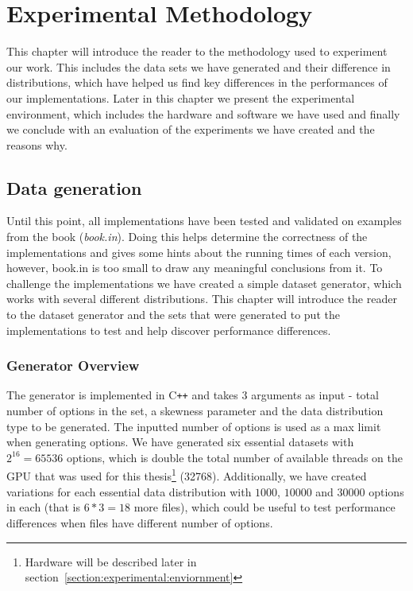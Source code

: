 \chapter{Experimental Methodology}
This chapter will introduce the reader to the methodology used to experiment our work. This includes the data sets we have generated and their difference in distributions, which have helped us find key differences in the performances of our implementations. Later in this chapter we present the experimental environment, which includes the hardware and software we have used and finally we conclude with an evaluation of the experiments we have created and the reasons why.

\label{chapter:experimentalmethodology}
\section{Data generation}
Until this point, all implementations have been tested and validated on examples from the book (\textit{book.in}). Doing this helps determine the correctness of the implementations and gives some hints about the running times of each version, however, book.in is too small to draw any meaningful conclusions from it. To challenge the implementations we have created a simple dataset generator, which works with several different distributions. This chapter will introduce the reader to the dataset generator and the sets that were generated to put the implementations to test and help discover performance differences.   

\subsection{Generator Overview}
The generator is implemented in C\texttt{++} and takes 3 arguments as input - total number of options in the set, a skewness parameter and the data distribution type to be generated. The inputted number of options is used as a max limit when generating options. We have generated six essential datasets with $2^{16}=65536$ options, which is double the total number of available threads on the GPU that was used for this thesis\footnote{Hardware will be described later in section~\ref{section:experimental:enviornment}} (32768). Additionally, we have created variations for each essential data distribution with $1000$, $10000$ and $30000$ options in each (that is $6*3=18$ more files), which could be useful to test performance differences when files have different number of options. 

